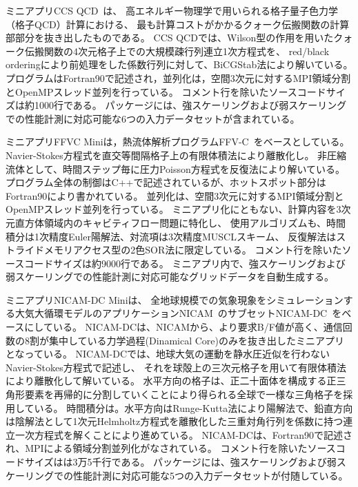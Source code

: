 ミニアプリCCS QCD~\cite{CCS-QCD_boku2012}\cite{CCS-QCD_terai2013}は、
高エネルギー物理学で用いられる格子量子色力学（格子QCD）計算における、
最も計算コストがかかるクォーク伝搬関数の計算部部分を抜き出したものである。
CCS QCDでは、Wilson型の作用を用いたクォーク伝搬関数の4次元格子上での大規模疎行列連立1次方程式を、
red/black orderingにより前処理をした係数行列に対して、BiCGStab法により解いている。
プログラムはFortran90で記述され，並列化は，空間3次元に対するMPI領域分割とOpenMPスレッド並列を行っている。
コメント行を除いたソースコードサイズは約1000行である。
パッケージには、強スケーリングおよび弱スケーリングでの性能計測に対応可能な6つの入力データセットが含まれている。

ミニアプリFFVC Miniは，熱流体解析プログラムFFV-C~\cite{FFVC_ono2014}をベースとしている。
Navier-Stokes方程式を直交等間隔格子上の有限体積法により離散化し。
非圧縮流体として、時間ステップ毎に圧力Poisson方程式を反復法により解いている。
プログラム全体の制御はC++で記述されているが、ホットスポット部分はFortran90により書かれている。
並列化は、空間3次元に対するMPI領域分割とOpenMPスレッド並列を行っている。
ミニアプリ化にともない、計算内容を3次元直方体領域内のキャビティフロー問題に特化し、
使用アルゴリズムも、時間積分は1次精度Euler陽解法、対流項は3次精度MUSCLスキーム、
反復解法はストライドメモリアクセス型の2色SOR法に限定している。
コメント行を除いたソースコードサイズは約9000行である。
ミニアプリ内で、強スケーリングおよび弱スケーリングでの性能計測に対応可能なグリッドデータを自動生成する。

ミニアプリNICAM-DC Miniは、
全地球規模での気象現象をシミュレーションする大気大循環モデルのアプリケーションNICAM~\cite{NICAM_satoh2008}のサブセットNICAM-DC~\cite{NICAM-DC_url}をベースにしている。
NICAM-DCは、NICAMから、より要求B/F値が高く、通信回数の8割が集中している力学過程(Dinamical Core)のみを抜き出したミニアプリとなっている。
NICAM-DCでは、地球大気の運動を静水圧近似を行わないNavier-Stokes方程式で記述し、
それを球殻上の三次元格子を用いて有限体積法により離散化して解いている。
水平方向の格子は、正二十面体を構成する正三角形要素を再帰的に分割していくことにより得られる全球で一様な三角格子を採用している。
時間積分は。水平方向はRunge-Kutta法により陽解法で、鉛直方向は陰解法として1次元Helmholtz方程式を離散化した三重対角行列を係数に持つ連立一次方程式を解くことにより進めている。
NICAM-DCは、Fortran90で記述され、MPIによる領域分割並列化がなされている。
コメント行を除いたソースコードサイズはは3万5千行である。
パッケージには、強スケーリングおよび弱スケーリングでの性能計測に対応可能な5つの入力データセットが付随している。

